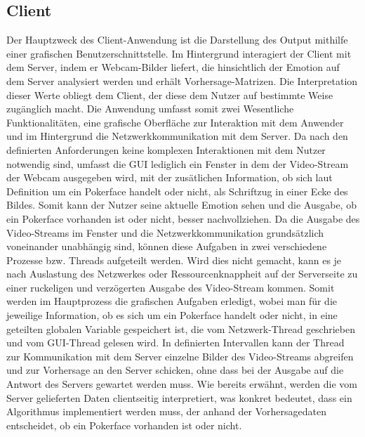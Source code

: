\documentclass[12pt, a4paper]{scrbook}
\begin{document}
\subsection{Client}
Der Hauptzweck des Client-Anwendung ist die Darstellung des Output mithilfe einer grafischen Benutzerschnittstelle. Im Hintergrund interagiert der Client mit dem Server, indem er Webcam-Bilder liefert, die hinsichtlich der Emotion auf dem Server analysiert werden und erhält Vorhersage-Matrizen. Die Interpretation dieser Werte obliegt dem Client, der diese dem Nutzer auf bestimmte Weise zugänglich macht. Die Anwendung umfasst somit zwei Wesentliche Funktionalitäten, eine grafische Oberfläche zur Interaktion mit dem Anwender und im Hintergrund die Netzwerkkommunikation mit dem Server. Da nach den definierten Anforderungen keine komplexen Interaktionen mit dem Nutzer notwendig sind, umfasst die GUI lediglich ein Fenster in dem der Video-Stream der Webcam ausgegeben wird, mit der zusätlichen Information, ob sich laut Definition um ein Pokerface handelt oder nicht, als Schriftzug in einer Ecke des Bildes. Somit kann der Nutzer seine aktuelle Emotion sehen und die Ausgabe, ob ein Pokerface vorhanden ist oder nicht, besser nachvollziehen. Da die Ausgabe des Video-Streams im Fenster und die Netzwerkkommunikation grundsätzlich voneinander unabhängig sind, können diese Aufgaben in zwei verschiedene Prozesse bzw. Threads aufgeteilt werden. Wird dies nicht gemacht, kann es je nach Auslastung des Netzwerkes oder Ressourcenknappheit auf der Serverseite zu einer ruckeligen und verzögerten Ausgabe des Video-Stream kommen. Somit werden im Hauptprozess die grafischen Aufgaben erledigt, wobei man für die jeweilige Information, ob es sich um ein Pokerface handelt oder nicht, in eine geteilten globalen Variable gespeichert ist, die vom Netzwerk-Thread geschrieben und vom GUI-Thread gelesen wird. In definierten Intervallen kann der Thread zur Kommunikation mit dem Server einzelne Bilder des Video-Streams abgreifen und zur Vorhersage an den Server schicken, ohne dass bei der Ausgabe auf die Antwort des Servers gewartet werden muss. Wie bereits erwähnt, werden die vom Server gelieferten Daten clientseitig interpretiert, was konkret bedeutet, dass ein Algorithmus implementiert werden muss, der anhand der Vorhersagedaten entscheidet, ob ein Pokerface vorhanden ist oder nicht. 
\end{document}
